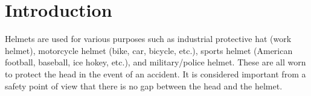 \documentclass[sigchi,authordraft]{acmart}
\begin{document}



\maketitle

\section{Introduction}
\label{sec:introduction}
Helmets are used for various purposes such as industrial protective hat (work helmet), motorcycle helmet (bike, car, bicycle, etc.), sports helmet (American football, baseball, ice hokey, etc.), and military/police helmet. These are all worn to protect the head in the event of an accident\cite{helmet}. It is considered important from a safety point of view that there is no gap between the head and the helmet.\par

\end{document}
